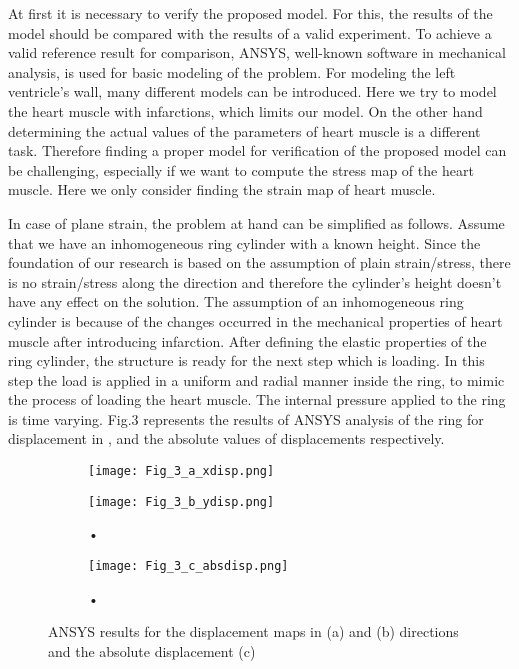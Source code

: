\documentclass{jicspack}
\begin{document}
At first it is necessary to verify the proposed model. For this, the results of the model should
be compared with the results of a valid experiment. To achieve a valid reference result for
comparison, ANSYS, well-known software in mechanical analysis, is used for basic modeling
of the problem. For modeling the left ventricle’s wall, many different models can be
introduced. Here we try to model the heart muscle with infarctions, which limits our model.
On the other hand determining the actual values of the parameters of heart muscle is a
different task. Therefore finding a proper model for verification of the proposed model can
be challenging, especially if we want to compute the stress map of the heart muscle. Here we only consider finding the strain map of heart muscle. 

In case of plane strain, the problem at hand can be simplified as follows. Assume that we
have an inhomogeneous ring cylinder with a known height. Since the foundation of our
research is based on the assumption of plain strain/stress, there is no strain/stress along the  direction and therefore the cylinder's height doesn't have any effect on the solution. The assumption of an inhomogeneous ring cylinder is because of the changes
occurred in the mechanical properties of heart muscle after introducing infarction.
After defining the elastic properties of the ring cylinder, the structure is ready for the next step which is loading. In this step the load is applied in a uniform and radial manner inside the ring, to mimic the process of loading the heart muscle. The internal pressure applied to the ring is time varying. Fig.3 represents the results of ANSYS analysis of the ring for displacement in ,  and the absolute values of displacements respectively. 

\begin{figure}
\centering
\begin{subfigure}[b]{.45\textwidth}
\texttt{[image: Fig\_3\_a\_xdisp.png]}
\caption{}
\end{subfigure}
\begin{subfigure}[b]{0.45\textwidth}
\texttt{[image: Fig\_3\_b\_ydisp.png]}
\caption{•}
\end{subfigure}

\begin{subfigure}[b]{0.45\textwidth}
\texttt{[image: Fig\_3\_c\_absdisp.png]}
\caption{•}
\end{subfigure}
\caption{ANSYS results for the displacement maps in  (a) and  (b) directions and the absolute displacement (c)}
\end{figure}
\end{document}
